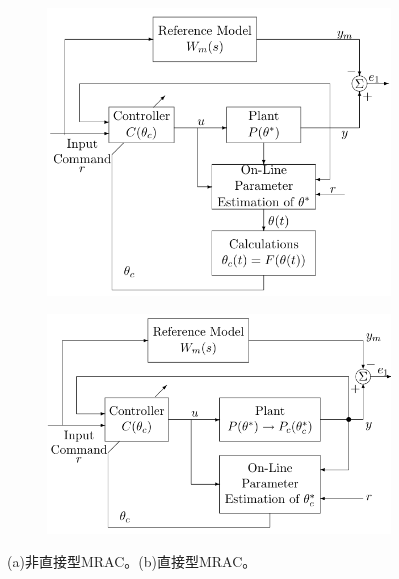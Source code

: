 \begin{figure}[htbp]
  \centering
  \begin{subfigure}{0.45\textwidth}
    \includegraphics[width=1\linewidth]{figure/adaptive/indirect_MRAC.png} %
    \caption{}
\end{subfigure}
  \begin{subfigure}{0.45\textwidth}
    \includegraphics[width=1\linewidth]{figure/adaptive/direct_MRAC.png} %
    \caption{}
\end{subfigure}
\caption{(a)非直接型MRAC。(b)直接型MRAC。}
\end{figure}